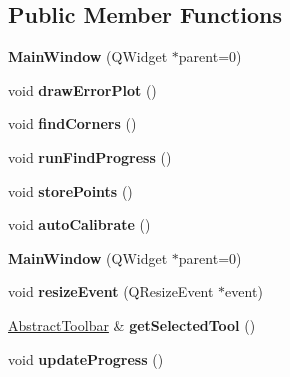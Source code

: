 \subsection*{Public Member Functions}
\begin{DoxyCompactItemize}
\item 
{\bfseries Main\+Window} (Q\+Widget $\ast$parent=0)\hypertarget{classMainWindow_a8b244be8b7b7db1b08de2a2acb9409db}{}\label{classMainWindow_a8b244be8b7b7db1b08de2a2acb9409db}

\item 
void {\bfseries draw\+Error\+Plot} ()\hypertarget{classMainWindow_a2d705b25b2921410f444b1dcb2aee17a}{}\label{classMainWindow_a2d705b25b2921410f444b1dcb2aee17a}

\item 
void {\bfseries find\+Corners} ()\hypertarget{classMainWindow_a55021f364c7c30a12a666d00381ede26}{}\label{classMainWindow_a55021f364c7c30a12a666d00381ede26}

\item 
void {\bfseries run\+Find\+Progress} ()\hypertarget{classMainWindow_a499be32b4af6e367284443fd92b53533}{}\label{classMainWindow_a499be32b4af6e367284443fd92b53533}

\item 
void {\bfseries store\+Points} ()\hypertarget{classMainWindow_a3ba7eeb08e9afb1a8aef441dc96c8724}{}\label{classMainWindow_a3ba7eeb08e9afb1a8aef441dc96c8724}

\item 
void {\bfseries auto\+Calibrate} ()\hypertarget{classMainWindow_a2a02ddbec29a67a4c73c0ad169e485b4}{}\label{classMainWindow_a2a02ddbec29a67a4c73c0ad169e485b4}

\item 
{\bfseries Main\+Window} (Q\+Widget $\ast$parent=0)\hypertarget{classMainWindow_a8b244be8b7b7db1b08de2a2acb9409db}{}\label{classMainWindow_a8b244be8b7b7db1b08de2a2acb9409db}

\item 
void {\bfseries resize\+Event} (Q\+Resize\+Event $\ast$event)\hypertarget{classMainWindow_ae12f8f63791595567b6250f8bb002bda}{}\label{classMainWindow_ae12f8f63791595567b6250f8bb002bda}

\item 
\hyperlink{classAbstractToolbar}{Abstract\+Toolbar} \& {\bfseries get\+Selected\+Tool} ()\hypertarget{classMainWindow_aef52d149d1d1594243305f9898d489ef}{}\label{classMainWindow_aef52d149d1d1594243305f9898d489ef}

\item 
void {\bfseries update\+Progress} ()\hypertarget{classMainWindow_a9c7b9ea401ee936062d089aeca0b5636}{}\label{classMainWindow_a9c7b9ea401ee936062d089aeca0b5636}


\end{DoxyCompactItemize}
